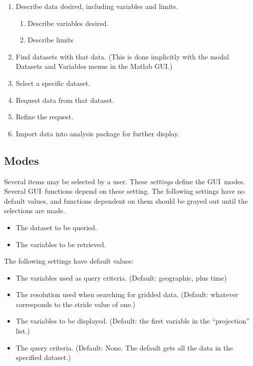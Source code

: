 \documentclass[10pt]{report}
\newcommand{\gui}{GUI}
\begin{document}
\begin{enumerate}
\item Describe data desired, including variables and limits.
  \begin{enumerate}
  \item Describe variables desired.
  \item Describe limits
  \end{enumerate}
\item Find datasets with that data. (This is done implicitly with the
  modal Datasets and Variables menus in the Matlab \gui .)
\item Select a specific dataset.
\item Request data from that dataset.
\item Refine the request.
\item Import data into analysis package for further display.
\end{enumerate}


\subsection{Modes}
\label{sec:modes}

Several items may be selected by a user.  These \emph{settings} define
the \gui\ modes.  Several \gui\ functions depend on these setting.
The following settings have no default values, and functions dependent
on them should be grayed out until the selections are made.

\begin{itemize}
\item The dataset to be queried.
\item The variables to be retrieved.
\end{itemize}

\noindent The following settings have default values:

\begin{itemize}
\item The variables used as query criteria. (Default: geographic, plus
  time)
\item The resolution used when searching for gridded data. (Default:
  whatever corresponds to the stride value of one.)
\item The variables to be displayed. (Default: the first variable in
  the ``projection'' list.)
\item The query criteria. (Default: None.  The default gets all the
  data in the specified dataset.)
\end{itemize}
\end{document}
